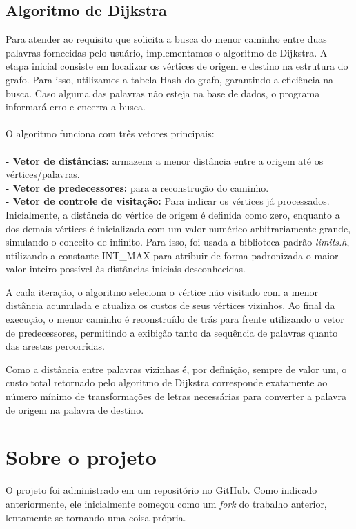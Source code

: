 \documentclass[a4paper, 12pt]{article}
\begin{document}
\subsection{Algoritmo de Dijkstra}
Para atender ao requisito que solicita a busca do menor caminho entre duas palavras
fornecidas pelo usuário, implementamos o algoritmo de Dijkstra. A etapa inicial
consiste em localizar os vértices de origem e destino na estrutura do grafo.
Para isso, utilizamos a tabela Hash do grafo, garantindo a eficiência na busca.
Caso alguma das palavras não esteja na base de dados, o programa informará erro e
encerra a busca.\\
\\O algoritmo funciona com três vetores principais:\\\\
\textbf{- Vetor de distâncias:} armazena a menor distância entre a origem até os
vértices/palavras.\\
\textbf{- Vetor de predecessores:} para a reconstrução do caminho.\\
\textbf{- Vetor de controle de visitação:} Para indicar os vértices já processados.\\

Inicialmente, a distância do vértice de origem é definida como zero, enquanto a dos
demais vértices é inicializada com um valor numérico arbitrariamente grande, simulando
o conceito de infinito. Para isso, foi usada a biblioteca padrão \textit{limits.h},
utilizando a constante INT\_MAX para atribuir de forma padronizada o maior valor 
inteiro possível às distâncias iniciais desconhecidas.

A cada iteração, o algoritmo seleciona o vértice não visitado com a menor distância
acumulada e atualiza os custos de seus vértices vizinhos. Ao final da execução, o
menor caminho é reconstruído de trás para frente utilizando o vetor de predecessores,
permitindo a exibição tanto da sequência de palavras quanto das arestas percorridas.

Como a distância entre palavras vizinhas é, por definição, sempre de valor um, o
custo total retornado pelo algoritmo de Dijkstra corresponde exatamente ao número
mínimo de transformações de letras necessárias para converter a palavra de origem
na palavra de destino.

\newpage
\section{Sobre o projeto}
O projeto foi administrado em um \href{https://github.com/atomicpenguinz/TEG_2}{repositório}
no GitHub. Como indicado anteriormente, ele inicialmente começou como um \textit{fork}
do trabalho anterior, lentamente se tornando uma coisa própria.
\end{document}
